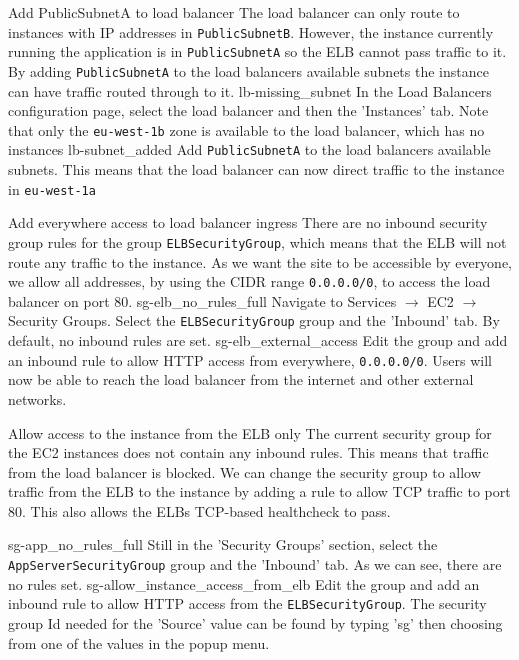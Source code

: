 {Add PublicSubnetA to load balancer}
{
	The load balancer can only route to instances with IP addresses in \texttt{PublicSubnetB}. However, the instance currently running the application is in \texttt{PublicSubnetA} so the ELB cannot pass traffic to it. By adding \texttt{PublicSubnetA} to the load balancers available subnets the instance can have traffic routed through to it.
}
{
	\imagefigsinglebox
	{lb-missing_subnet}
	{In the Load Balancers configuration page, select the load balancer and then the 'Instances' tab. Note that only the \texttt{eu-west-1b} zone is available to the load balancer, which has no instances}
	\imagefigsinglebox
		{lb-subnet_added}
	{Add \texttt{PublicSubnetA} to the load balancers available subnets. This means that the load balancer can now direct traffic to the instance in \texttt{eu-west-1a}}
}

\FloatBarrier

{Add everywhere access to load balancer ingress}
{
There are no inbound security group rules for the group \texttt{ELBSecurityGroup}, which means that the ELB will not route any traffic to the instance. As we want the site to be accessible by everyone, we allow all addresses, by using the CIDR range \texttt{0.0.0.0/0}, to access the load balancer on port $80$.
}
{
	\imagefigsinglebox
	{sg-elb_no_rules_full}
 	{ Navigate to Services  $\rightarrow$ EC2  $\rightarrow$ Security Groups. Select the \texttt{ELBSecurityGroup} group and the 'Inbound' tab. By default, no inbound rules are set.}
	\imagefigsinglebox
	{sg-elb_external_access}
	{Edit the group and add an inbound rule to allow HTTP access from everywhere, \texttt{0.0.0.0/0}. Users will now be able to reach the load balancer from the internet and other external networks.}
}


\FloatBarrier


{Allow access to the instance from the ELB only}
{The current security group for the EC2 instances does not contain any inbound rules. This means that traffic from the load balancer is blocked. We can change the security group to allow traffic from the ELB to the instance by adding a rule to allow TCP traffic to port 80. This also allows the ELBs TCP-based healthcheck to pass.
}
{
	
	\imagefigsinglebox
	{sg-app_no_rules_full}
	{Still in the 'Security Groups' section, select the \texttt{AppServerSecurityGroup} group and the 'Inbound' tab. As we can see, there are no rules set.}
	\imagefigsinglebox
	{sg-allow_instance_access_from_elb}
	{Edit the group and add an inbound rule to allow HTTP access from the \texttt{ELBSecurityGroup}. The security group Id needed for the 'Source' value can be found by typing 'sg' then choosing from one of the values in the popup menu.}
}


